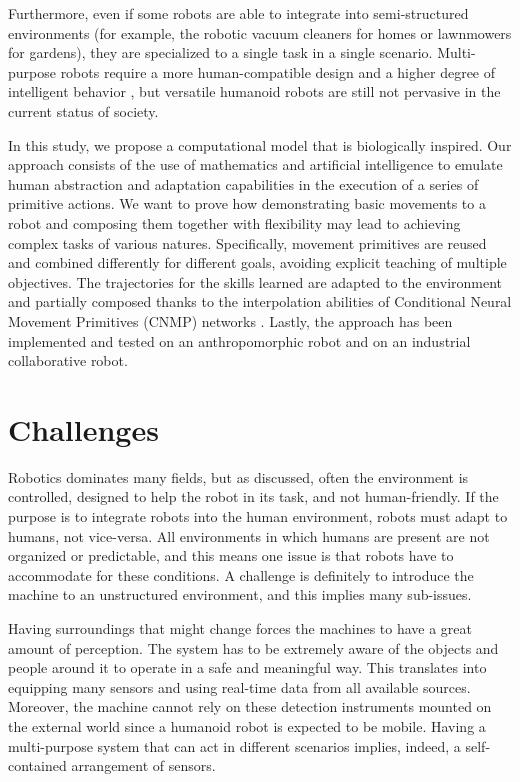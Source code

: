Furthermore, even if some robots are able to integrate into semi-structured environments (for example, the robotic vacuum cleaners for homes or lawnmowers for gardens), they are specialized to a single task in a single scenario. Multi-purpose robots require a more human-compatible design and a higher degree of intelligent behavior \cite{dechant2021toward}, but versatile humanoid robots are still not pervasive in the current status of society. 

In this study, we propose a computational model that is biologically inspired. Our approach consists of the use of mathematics and artificial intelligence to emulate human abstraction and adaptation capabilities in the execution of a series of primitive actions. 
We want to prove how demonstrating basic movements to a robot and composing them together with flexibility may lead to achieving complex tasks of various natures.
Specifically, movement primitives are reused and combined differently for different goals, avoiding explicit teaching of multiple objectives. The trajectories for the skills learned are adapted to the environment and partially composed thanks to the interpolation abilities of Conditional Neural Movement Primitives (CNMP) networks \cite{Ugur-RSS-19}.
Lastly, the approach has been implemented and tested on an anthropomorphic robot and on an industrial collaborative robot.



\section{Challenges}
Robotics dominates many fields, but as discussed, often the environment is controlled, designed to help the robot in its task, and not human-friendly. If the purpose is to integrate robots into the human environment, robots must adapt to humans, not vice-versa. All environments in which humans are present are not organized or predictable, and this means one issue is that robots have to accommodate for these conditions. A challenge is definitely to introduce the machine to an unstructured environment, and this implies many sub-issues. 

Having surroundings that might change forces the machines to have a great amount of perception. The system has to be extremely aware of the objects and people around it to operate in a safe and meaningful way. This translates into equipping many sensors and using real-time data from all available sources. Moreover, the machine cannot rely on these detection instruments mounted on the external world since a humanoid robot is expected to be mobile. Having a multi-purpose system that can act in different scenarios implies, indeed, a self-contained arrangement of sensors.

